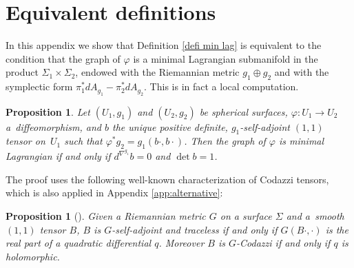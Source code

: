 \documentclass[JEP,XML,SOM,Unicode,NoEqCountersInSection,published]{cedram}
\newtheorem{prop}[cor]{Proposition}
\theoremstyle{definition}
\begin{document}
\appendix

\section{Equivalent definitions}\label{app:defis}

In this appendix we show that Definition \ref{defi min lag} is equivalent to the condition that the graph of $\varphi$ is a minimal Lagrangian submanifold in the product $\Sigma_1\times\Sigma_2$, endowed with the Riemannian metric $g_1\oplus g_2$ and with the symplectic form $\pi_1^*dA_{g_1}-\pi_2^*dA_{g_2}$. This is in fact a local computation.

\begin{prop}\label{prop:app1}
Let $(U_1,g_1)$ and $(U_2,g_2)$ be spherical surfaces, $\varphi:U_1\to U_2$ a~diffeomorphism, and $b$ the unique positive definite, $g_1$-self-adjoint $(1,1)$ tensor on~$U_1$ such that $\varphi^*g_2=g_1(b\cdot,b\cdot)$. Then the graph of $\varphi$ is minimal Lagrangian if and only if $d^{\nabla^{g_1}}\!b=0$ and $\det b=1$.
\end{prop}

The proof uses the following well-known characterization of Codazzi tensors, which is also applied in Appendix \ref{app:alternative}:

\begin{prop}[{\cite{zbMATH03064601}}] \label{prop hopf}
Given a Riemannian metric $G$ on a surface $\Sigma$ and a~smooth $(1,1)$ tensor $B$, $B$ is $G$-self-adjoint and traceless if and only if $G(B\cdot,\cdot)$ is the real part of a quadratic differential $q$. Moreover $B$ is $G$-Codazzi if and only if $q$ is holomorphic.
\end{prop}
\end{document}
